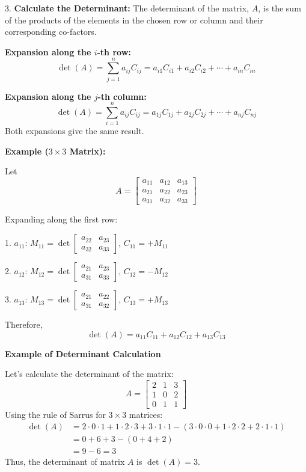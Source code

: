  3.\textbf{ Calculate the Determinant:} The determinant of the matrix, \(A\), is the sum of 
 the products of the elements in the chosen row or column and their corresponding co-factors.

    \textbf{Expansion along the \(i\)-th row:}
        \[
        \det(A) = \sum_{j=1}^{n} a_{ij} C_{ij} = a_{i1}C_{i1} + a_{i2}C_{i2} + \cdots + a_{in}C_{in}
        \]

    \textbf{Expansion along the \(j\)-th column:}
        \[
        \det(A) = \sum_{i=1}^{n} a_{ij} C_{ij} = a_{1j}C_{1j} + a_{2j}C_{2j} + \cdots + a_{nj}C_{nj}
        \]
        Both expansions give the same result.

\textbf{Example (\(3\times3\) Matrix):}

Let
\[
A = \begin{bmatrix}
a_{11} & a_{12} & a_{13} \\
a_{21} & a_{22} & a_{23} \\
a_{31} & a_{32} & a_{33}
\end{bmatrix}
\]

Expanding along the first row:

1. \(a_{11}\):  \(M_{11} = \det \begin{bmatrix} a_{22} & a_{23} \\ a_{32} & a_{33} \end{bmatrix}\),  \(C_{11} = +M_{11}\)

2. \(a_{12}\):  \(M_{12} = \det \begin{bmatrix} a_{21} & a_{23} \\ a_{31} & a_{33} \end{bmatrix}\),  \(C_{12} = -M_{12}\)

3. \(a_{13}\):  \(M_{13} = \det \begin{bmatrix} a_{21} & a_{22} \\ a_{31} & a_{32} \end{bmatrix}\),  \(C_{13} = +M_{13}\)

Therefore,
\[
\det(A) = a_{11}C_{11} + a_{12}C_{12} + a_{13}C_{13}
\]

\textbf{Example of Determinant Calculation}

Let's calculate the determinant of the matrix:
\begin{equation*}
A =
\begin{bmatrix}
2 & 1 & 3 \\
1 & 0 & 2 \\
0 & 1 & 1
\end{bmatrix}
\end{equation*}
Using the rule of Sarrus for \(3 \times 3\) matrices:
\begin{align*}
\det(A) &= 2 \cdot 0 \cdot 1 + 1 \cdot 2 \cdot 3 + 3 \cdot 1 \cdot 1 - (3 \cdot 0 \cdot 0 + 1 \cdot 2 \cdot 2 + 2 \cdot 1 \cdot 1) \\
&= 0 + 6 + 3 - (0 + 4 + 2) \\
&= 9 - 6 = 3
\end{align*}
 Thus, the determinant of matrix \(A\) is \(\det(A) = 3\).

